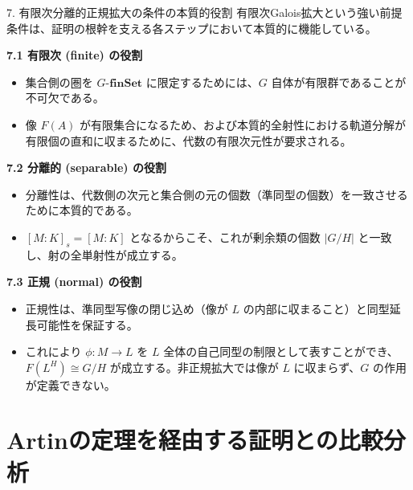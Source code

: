 \documentclass[10pt, unicode]{beamer}
\theoremstyle{definition}
\begin{document}
\begin{frame}[allowframebreaks]{7. 有限次分離的正規拡大の条件の本質的役割}
    有限次Galois拡大という強い前提条件は、証明の根幹を支える各ステップにおいて本質的に機能している。

    \textbf{7.1 有限次 (finite) の役割}
    \begin{itemize}
        \item 集合側の圏を $G\text{-}\mathbf{finSet}$ に限定するためには、$G$ 自体が有限群であることが不可欠である。
        \item 像 $F(A)$ が有限集合になるため、および本質的全射性における軌道分解が有限個の直和に収まるために、代数の有限次元性が要求される。
    \end{itemize}

    \textbf{7.2 分離的 (separable) の役割}
    \begin{itemize}
        \item 分離性は、代数側の次元と集合側の元の個数（準同型の個数）を一致させるために本質的である。
        \item $[M:K]_s = [M:K]$ となるからこそ、これが剰余類の個数 $|G/H|$ と一致し、射の全単射性が成立する。
    \end{itemize}

    \textbf{7.3 正規 (normal) の役割}
    \begin{itemize}
        \item 正規性は、準同型写像の閉じ込め（像が $L$ の内部に収まること）と同型延長可能性を保証する。
        \item これにより $\phi: M \to L$ を $L$ 全体の自己同型の制限として表すことができ、$F(L^H) \cong G/H$ が成立する。非正規拡大では像が $L$ に収まらず、$G$ の作用が定義できない。
    \end{itemize}
\end{frame}

\section{Artinの定理を経由する証明との比較分析}
\end{document}
